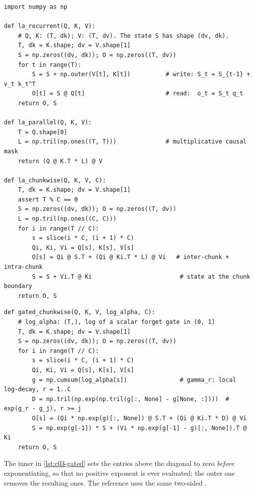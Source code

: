 \begin{lstlisting}[caption={Reference implementation (ours): linear attention in recurrent, parallel and chunkwise form (\cref{alg:c03-recurrent}, \cref{eq:c03-parallel}, \cref{alg:c03-chunk}).},label={lst:c03-ours-la}]
import numpy as np

def la_recurrent(Q, K, V):
    # Q, K: (T, dk); V: (T, dv). The state S has shape (dv, dk).
    T, dk = K.shape; dv = V.shape[1]
    S = np.zeros((dv, dk)); O = np.zeros((T, dv))
    for t in range(T):
        S = S + np.outer(V[t], K[t])          # write: S_t = S_{t-1} + v_t k_t^T
        O[t] = S @ Q[t]                       # read:  o_t = S_t q_t
    return O, S

def la_parallel(Q, K, V):
    T = Q.shape[0]
    L = np.tril(np.ones((T, T)))              # multiplicative causal mask
    return (Q @ K.T * L) @ V

def la_chunkwise(Q, K, V, C):
    T, dk = K.shape; dv = V.shape[1]
    assert T % C == 0
    S = np.zeros((dv, dk)); O = np.zeros((T, dv))
    L = np.tril(np.ones((C, C)))
    for i in range(T // C):
        s = slice(i * C, (i + 1) * C)
        Qi, Ki, Vi = Q[s], K[s], V[s]
        O[s] = Qi @ S.T + (Qi @ Ki.T * L) @ Vi   # inter-chunk + intra-chunk
        S = S + Vi.T @ Ki                         # state at the chunk boundary
    return O, S
\end{lstlisting}

\begin{lstlisting}[caption={Reference implementation (ours): chunkwise scalar-gated linear attention with chunk-local log-space decay (\cref{prop:c03-chunk-gated}). With \texttt{log\_alpha = dt * a}, \texttt{V = dt * X}, \texttt{K = B}, \texttt{Q = C} this is Mamba-2's SSD.},label={lst:c03-gated}]
def gated_chunkwise(Q, K, V, log_alpha, C):
    # log_alpha: (T,), log of a scalar forget gate in (0, 1]
    T, dk = K.shape; dv = V.shape[1]
    S = np.zeros((dv, dk)); O = np.zeros((T, dv))
    for i in range(T // C):
        s = slice(i * C, (i + 1) * C)
        Qi, Ki, Vi = Q[s], K[s], V[s]
        g = np.cumsum(log_alpha[s])               # gamma_r: local log-decay, r = 1..C
        D = np.tril(np.exp(np.tril(g[:, None] - g[None, :])))  # exp(g_r - g_j), r >= j
        O[s] = (Qi * np.exp(g)[:, None]) @ S.T + (Qi @ Ki.T * D) @ Vi
        S = np.exp(g[-1]) * S + (Vi * np.exp(g[-1] - g)[:, None]).T @ Ki
    return O, S
\end{lstlisting}

The inner  in \cref{lst:c03-gated} sets the entries above the diagonal to zero
\emph{before} exponentiating, so that no positive exponent is ever evaluated; the outer one
removes the resulting ones. The \fla{} reference  uses the same
two-sided .

